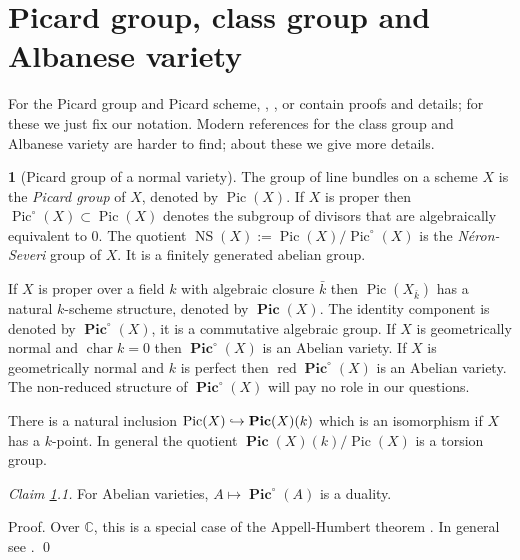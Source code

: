 \documentclass{amsart}
\theoremstyle{definition}
\newtheorem{say}[thm]{}
\theoremstyle{remark}
\renewcommand{\c}[0]{{\mathbb C}}
\newcommand{\pic}[0]{\operatorname{Pic}}
\newcommand{\pics}[0]{\operatorname{\mathbf{Pic}}}
\newcommand{\pico}[0]{\operatorname{\mathbf{Pic}}^{\circ}}
\newcommand{\ns}[0]{\operatorname{NS}}
\newcommand{\red}[0]{\operatorname{red}}
\newcommand{\chr}[0]{\operatorname{char}}
\def\into{\DOTSB\lhook\joinrel\to}
\begin{document}
\section{Picard group, class group and Albanese variety}\label{pic.cl.alb.sec}


For the  Picard group and Picard scheme, \cite[Lects.V-VI]{FGA}, \cite[Sec.19]{mumf66}, 
\cite{mumf-abvar}
 or \cite{blr} contain proofs and details; for these we just fix our notation. 
Modern references for the class group and Albanese variety are harder to find; about these we give more details.



\begin{say}[Picard group  of a normal variety]\label{pic.cl.norm.say}
The group of line bundles on a scheme  $X$ is the {\it Picard group} of $X$, denoted by $\pic(X)$.  If $X$ is proper then $\pic^\circ(X)\subset \pic(X)$ denotes  the subgroup of divisors that are algebraically equivalent to 0. 
The quotient   $\ns(X):=\pic(X)/\pic^\circ(X)$ is   the {\it N\'eron-Severi} group of $X$.
It is a finitely generated abelian group.

If $X$ is proper over a field $k$
with algebraic closure $\bar k$
then $\pic(X_{\bar k})$ 
 has a natural $k$-scheme structure, denoted by $\pics(X)$. The identity component  is denoted by $\pico(X)$, it is a commutative algebraic group. 
If $X$ is geometrically normal and $\chr k=0$ then $\pico(X)$ is an Abelian variety.
If $X$ is geometrically normal and $k$ is perfect then $\red\pico(X)$ is an Abelian variety.
The  non-reduced structure of  $\pico(X)$ will pay no role in our questions.


There is a natural inclusion $\pic(X)\into \pics(X)(k)$ which is an
isomorphism if $X$ has a $k$-point. In general the quotient
$\pics(X)(k)/\pic(X)$ is a torsion group.

\medskip

{\it Claim \ref{pic.cl.norm.say}.1.} For Abelian varieties, $A\mapsto \pico(A)$ is a duality. 
\medskip

Proof. Over $\c$, this is a special case of the  Appell-Humbert theorem
\cite[pp.21-22]{mumf-abvar}. In general see \cite[Sec.13]{mumf-abvar}. \qed
\end{say}
\end{document}
